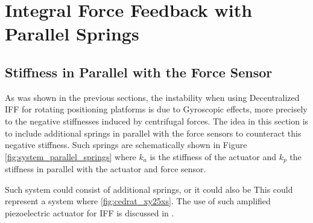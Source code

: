 \documentclass{ISMA_USD2020}
\begin{document}
\section{Integral Force Feedback with Parallel Springs}
\label{sec:orga467957}
\label{sec:iff_kp}
\subsection{Stiffness in Parallel with the Force Sensor}
\label{sec:org298d71d}

As was shown in the previous sections, the instability when using Decentralized IFF for rotating positioning platforms is due to Gyroscopic effects, more precisely to the negative stiffnesses induced by centrifugal forces.
The idea in this section is to include additional springs in parallel with the force sensors to counteract this negative stiffness.
Such springs are schematically shown in Figure \ref{fig:system_parallel_springs} where \(k_a\) is the stiffness of the actuator and \(k_p\) the stiffness in parallel with the actuator and force sensor.

Such system could consist of additional springs, or it could also be
This could represent a system where \ref{fig:cedrat_xy25xs}.
The use of such amplified piezoelectric actuator for IFF is discussed in  \cite{souleille18_concep_activ_mount_space_applic}.
\end{document}
